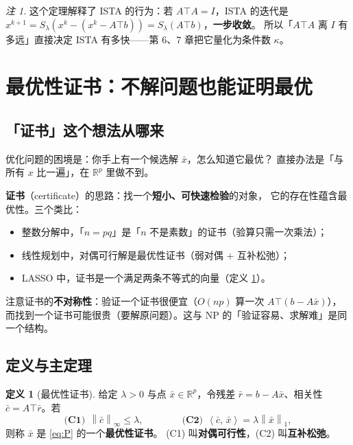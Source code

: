 \documentclass[11pt,a4paper,UTF8]{ctexart}
\theoremstyle{plain}
\theoremstyle{definition}
\newtheorem{definition}[theorem]{定义}
\theoremstyle{remark}
\newtheorem{remark}[theorem]{注}
\newcommand{\R}{\mathbb{R}}
\newcommand{\norm}[1]{\left\lVert #1 \right\rVert}
\newcommand{\inner}[2]{\left\langle #1,\, #2 \right\rangle}
\begin{document}
\begin{remark}
这个定理解释了 ISTA 的行为：若 $A\top A=I$，ISTA 的迭代是
$x^{k+1}=S_\lambda(x^k-(x^k-A\top b))=S_\lambda(A\top b)$，\textbf{一步收敛}。
所以「$A\top A$ 离 $I$ 有多远」直接决定 ISTA 有多快——第 6、7 章把它量化为条件数 $\kappa$。
\end{remark}

\section{最优性证书：不解问题也能证明最优}

\subsection{「证书」这个想法从哪来}

优化问题的困境是：你手上有一个候选解 $\bar x$，怎么知道它最优？
直接办法是「与所有 $x$ 比一遍」，在 $\R^p$ 里做不到。

\textbf{证书}（certificate）的思路：找一个\textbf{短小、可快速检验}的对象，
它的存在性蕴含最优性。三个类比：
\begin{itemize}
\item 整数分解中，「$n=pq$」是「$n$ 不是素数」的证书（验算只需一次乘法）；
\item 线性规划中，对偶可行解是最优性证书（弱对偶 + 互补松弛）；
\item LASSO 中，证书是一个满足两条不等式的向量（定义 \ref{def:cert}）。
\end{itemize}

注意证书的\textbf{不对称性}：验证一个证书很便宜（$O(np)$ 算一次 $A\top(b-A\bar x)$），
而找到一个证书可能很贵（要解原问题）。这与 NP 的「验证容易、求解难」是同一个结构。

\subsection{定义与主定理}

\begin{definition}[最优性证书]\label{def:cert}
给定 $\lambda>0$ 与点 $\bar x\in\R^p$，令残差 $\bar r=b-A\bar x$、相关性 $\bar c=A\top\bar r$。若
\begin{equation}
\textbf{(C1)}\ \ \norm{\bar c}_\infty\le\lambda,
\qquad\qquad
\textbf{(C2)}\ \ \inner{\bar c}{\bar x}=\lambda\norm{\bar x}_1,
\label{eq:cert}
\end{equation}
则称 $\bar x$ 是 \eqref{eq:P} 的一个\textbf{最优性证书}。
(C1) 叫\textbf{对偶可行性}，(C2) 叫\textbf{互补松弛}。
\end{definition}
\end{document}
